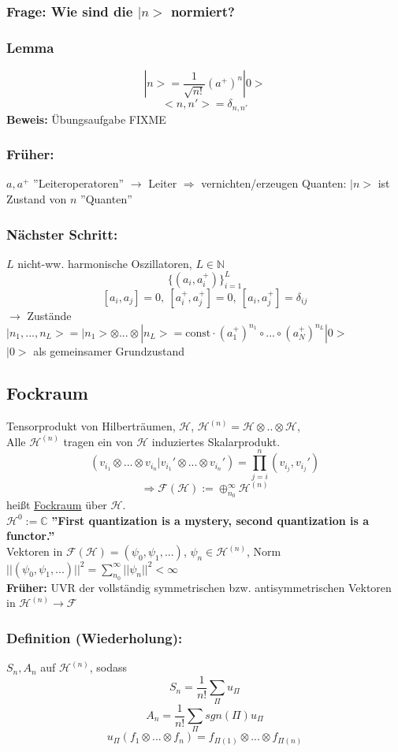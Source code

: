 \documentclass[twoside,a4paper]{scrartcl}
\newcommand{\C}{\mathbb{C}}
\renewcommand{\1}{\mathds{1}}
\newcommand{\Ra}{\Rightarrow}
\newcommand{\ra}{\rightarrow}
\renewcommand{\H}{\mathcal{H}}
\newcommand{\F}{\mathcal{F}}
\renewcommand{\C}{\mathbb{C}}
\begin{document}
\subsubsection*{Frage: Wie sind die $|n>$ normiert?} 
\subsubsection*{Lemma} 
$$|n>=\frac{1}{\sqrt{n!}}(a^+)^n|0>$$
$$<n,n'>=\delta_{n,n'}$$
\textbf{Beweis:} Übungsaufgabe FIXME
\subsubsection*{Früher:} 
$a,a^+$ ''Leiteroperatoren'' $\ra$ Leiter $\Ra$ vernichten/erzeugen Quanten: $|n>$ ist Zustand von $n$ ''Quanten''
\subsubsection*{Nächster Schritt:} 
$L$ nicht-ww. harmonische Oszillatoren, $L\in \mathbb{N}$
$$\{(a_i,a_i^+)\}^L_{i=1}$$
$$[a_i,a_j]=0, \ [a_i^+,a_j^+]=0, \ [a_i,a_j^+]=\delta_{ij}$$
$\ra$ Zustände $|n_1,...,n_L>=|n_1>\otimes ... \otimes |n_L>=\mathrm{const}\cdot (a_1^+)^{n_1} \circ ... \circ (a_N^+)^{n_L}|0>$\\
$|0>$ als gemeinsamer Grundzustand

\subsection{Fockraum} 
Tensorprodukt von Hilberträumen, $\H$, $\H^{(n)}=\H \otimes .. \otimes \H$,\\
Alle $\H^{(n)}$ tragen ein von $\H$ induziertes Skalarprodukt.
$$(v_{i_1}\otimes ... \otimes v_{i_n}|v_{i_1}'\otimes ... \otimes v_{i_n}')=\prod_{j=i}^n (v_{i_j},v_{i_j}')$$
$$\Ra \F(\H):=\oplus_{n_0}^\infty \H^{(n)}$$
heißt \underline{Fockraum} über $\H$.\\
$\H^0:= \C$
\textbf{''First quantization is a mystery, second quantization is a functor.''}\\
Vektoren in $\F(\H)=(\psi_0,\psi_1,...)$, $\psi_n\in \H^{(n)}$, Norm $||(\psi_0,\psi_1,...)||^2=\sum_{n_0}^\infty||\psi_n||^2 <\infty$\\
\textbf{Früher:} UVR der vollständig symmetrischen bzw. antisymmetrischen Vektoren in $\H^{(n)} \ra \F$

\subsubsection*{Definition (Wiederholung):} 
$S_n, A_n$ auf $\H^{(n)}$, sodass 
$$S_n=\frac{1}{n!} \sum_\Pi u_\Pi$$
$$A_n=\frac{1}{n!} \sum_\Pi sgn(\Pi) u_\Pi$$
$$u_\Pi(f_1\otimes ... \otimes f_n)=f_{\Pi(1)}\otimes ... \otimes f_{\Pi(n)}$$
\end{document}
